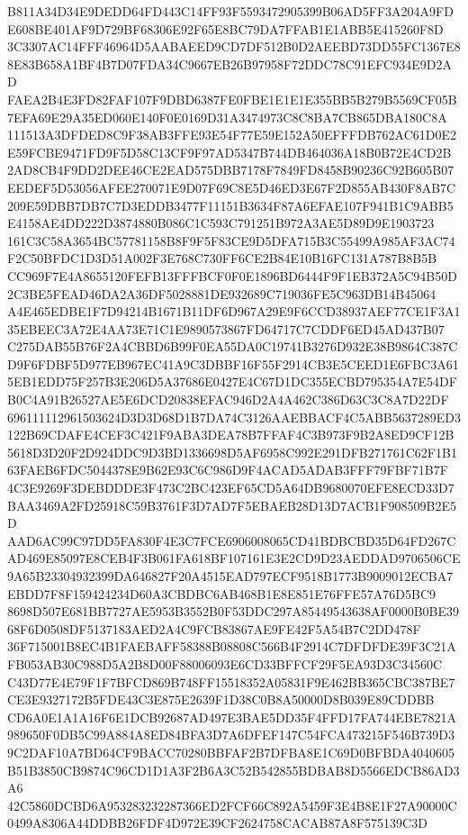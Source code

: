 \documentclass[UTF8,fontset=fandol,zihao=-4,a4paper]{ctexart}
\begin{document}
{{B811A34D34E9DEDD64FD443C14FF93F5593472905399B06AD5FF3A204A9FDE608BE401AF9D729BF68306E92F65E8BC79DA7FFAB1E1ABB5E415260F8D
3C3307AC14FFF46964D5AABAEED9CD7DF512B0D2AEEBD73DD55FC1367E88E83B658A1BF4B7D07FDA34C9667EB26B97958F72DDC78C91EFC934E9D2AD
FAEA2B4E3FD82FAF107F9DBD6387FE0FBE1E1E1E355BB5B279B5569CF05B7EFA69E29A35ED060E140F0E0169D31A3474973C8C8BA7CB865DBA180C8A
111513A3DFDED8C9F38AB3FFE93E54F77E59E152A50EFFFDB762AC61D0E2E59FCBE9471FD9F5D58C13CF9F97AD5347B744DB464036A18B0B72E4CD2B
2AD8CB4F9DD2DEE46CE2EAD575DBB7178F7849FD8458B90236C92B605B07EEDEF5D53056AFEE270071E9D07F69C8E5D46ED3E67F2D855AB430F8AB7C
209E59DBB7DB7C7D3EDDB3477F11151B3634F87A6EFAE107F941B1C9ABB5E4158AE4DD222D3874880B086C1C593C791251B972A3AE5D89D9E1903723
161C3C58A3654BC57781158B8F9F5F83CE9D5DFA715B3C55499A985AF3AC74F2C50BFDC1D3D51A002F3E768C730FF6CE2B84E10B16FC131A787B8B5B
CC969F7E4A8655120FEFB13FFFBCF0F0E1896BD6444F9F1EB372A5C94B50D2C3BE5FEAD46DA2A36DF5028881DE932689C719036FE5C963DB14B45064
A4E465EDBE1F7D94214B1671B11DF6D967A29E9F6CCD38937AEF77CE1F3A135EBEEC3A72E4AA73E71C1E9890573867FD64717C7CDDF6ED45AD437B07
C275DAB55B76F2A4CBBD6B99F0EA55DA0C19741B3276D932E38B9864C387CD9F6FDBF5D977EB967EC41A9C3DBBF16F55F2914CB3E5CEED1E6FBC3A61
5EB1EDD75F257B3E206D5A37686E0427E4C67D1DC355ECBD795354A7E54DFB0C4A91B26527AE5E6DCD20838EFAC946D2A4A462C386D63C3C8A7D22DF
696111112961503624D3D3D68D1B7DA74C3126AAEBBACF4C5ABB5637289ED3122B69CDAFE4CEF3C421F9ABA3DEA78B7FFAF4C3B973F9B2A8ED9CF12B
5618D3D20F2D924DDC9D3BD1336698D5AF6958C992E291DFB271761C62F1B163FAEB6FDC5044378E9B62E93C6C986D9F4ACAD5ADAB3FFF79FBF71B7F
4C3E9269F3DEBDDDE3F473C2BC423EF65CD5A64DB9680070EFE8ECD33D7BAA3469A2FD25918C59B3761F3D7AD7F5EBAEB28D13D7ACB1F908509B2E5D
AAD6AC99C97DD5FA830F4E3C7FCE6906008065CD41BDBCBD35D64FD267CAD469E85097E8CEB4F3B061FA618BF107161E3E2CD9D23AEDDAD9706506CE
9A65B23304932399DA646827F20A4515EAD797ECF9518B1773B9009012ECBA7EBDD7F8F159424234D60A3CBDBC6AB468B1E8E851E76FFE57A76D5BC9
8698D507E681BB7727AE5953B3552B0F53DDC297A85449543638AF0000B0BE3968F6D0508DF5137183AED2A4C9FCB83867AE9FE42F5A54B7C2DD478F
36F715001B8EC4B1FAEBAFF58388B08808C566B4F2914C7DFDFDE39F3C21AFB053AB30C988D5A2B8D00F88006093E6CD33BFFCF29F5EA93D3C34560C
C43D77E4E79F1F7BFCD869B748FF15518352A05831F9E462BB365CBC387BE7CE3E9327172B5FDE43C3E875E2639F1D38C0B8A50000D8B039E89CDDBB
CD6A0E1A1A16F6E1DCB92687AD497E3BAE5DD35F4FFD17FA744EBE7821A989650F0DB5C99A884A8ED84BFA3D7A6DFEF147C54FCA473215F546B739D3
9C2DAF10A7BD64CF9BACC70280BBFAF2B7DFBA8E1C69D0BFBDA4040605B51B3850CB9874C96CD1D1A3F2B6A3C52B542855BDBAB8D5566EDCB86AD3A6
42C5860DCBD6A953283232287366ED2FCF66C892A5459F3E4B8E1F27A90000C0499A8306A44DDBB26FDF4D972E39CF2624758CACAB87A8F575139C3D
}}
\end{document}
